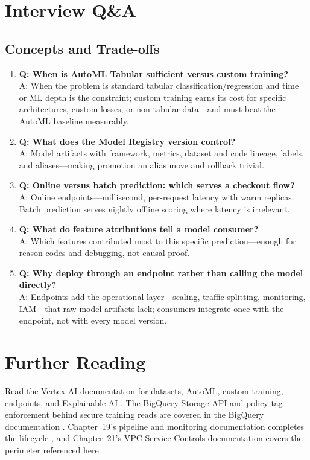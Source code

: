 \section{Interview Q\&A}
\subsection{Concepts and Trade-offs}
\begin{enumerate}
    \item \textbf{Q: When is AutoML Tabular sufficient versus custom training?}\\
    A: When the problem is standard tabular classification/regression and time or ML depth is the constraint; custom training earns its cost for specific architectures, custom losses, or non-tabular data---and must beat the AutoML baseline measurably.

    \item \textbf{Q: What does the Model Registry version control?}\\
    A: Model artifacts with framework, metrics, dataset and code lineage, labels, and aliases---making promotion an alias move and rollback trivial.

    \item \textbf{Q: Online versus batch prediction: which serves a checkout flow?}\\
    A: Online endpoints---millisecond, per-request latency with warm replicas. Batch prediction serves nightly offline scoring where latency is irrelevant.

    \item \textbf{Q: What do feature attributions tell a model consumer?}\\
    A: Which features contributed most to this specific prediction---enough for reason codes and debugging, not causal proof.

    \item \textbf{Q: Why deploy through an endpoint rather than calling the model directly?}\\
    A: Endpoints add the operational layer---scaling, traffic splitting, monitoring, IAM---that raw model artifacts lack; consumers integrate once with the endpoint, not with every model version.
\end{enumerate}

\section{Further Reading}
Read the Vertex AI documentation for datasets, AutoML, custom training, endpoints, and Explainable AI \cite{googlecloudvertexaidocs}. The BigQuery Storage API and policy-tag enforcement behind secure training reads are covered in the BigQuery documentation \cite{googlecloudbigquerydocs}. Chapter~19's pipeline and monitoring documentation completes the lifecycle \cite{googlecloudvertexpipelines}, and Chapter~21's VPC Service Controls documentation covers the perimeter referenced here \cite{googlecloudvpcscdocs}.

